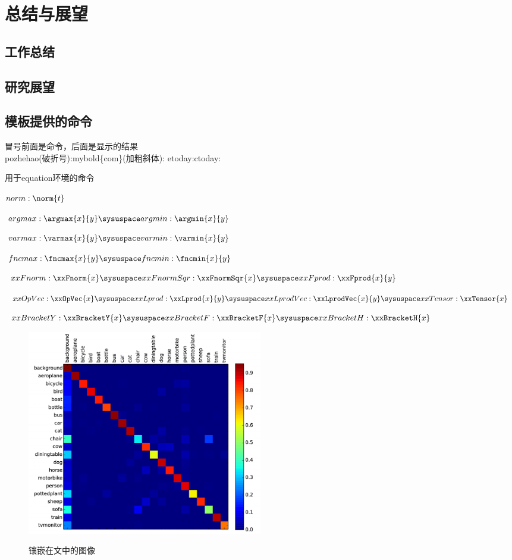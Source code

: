 
\chapter{总结与展望}
\section{工作总结}
\section{研究展望}
\section{模板提供的命令}
冒号前面是命令，后面是显示的结果\\

pozhehao(破折号):\pozhehao \sysuspace mybold\{com\}(加粗斜体): \sysuspace  etoday:\etoday\sysuspace ctoday:\ctoday\sysuspace


用于equation环境的命令

$norm :\norm{t}$

$argmax:\argmax{x}{y}\sysuspace argmin:\argmin{x}{y}$

$varmax:\varmax{x}{y}\sysuspace  varmin:\varmin{x}{y}$

$fncmax:\fncmax{x}{y}\sysuspace  fncmin:\fncmin{x}{y}$

$xxFnorm:\xxFnorm{x}\sysuspace xxFnormSqr:\xxFnormSqr{x}\sysuspace xxFprod:\xxFprod{x}{y}$

$xxOpVec:\xxOpVec{x}\sysuspace xxLprod:\xxLprod{x}{y}\sysuspace xxLprodVec:\xxLprodVec{x}{y}\sysuspace xxTensor:\xxTensor{x}$

$xxBracketY:\xxBracketY{x}\sysuspace xxBracketF:\xxBracketF{x}\sysuspace xxBracketH:\xxBracketH{x}$

\begin{figure}
	\centering
	\includegraphics[width=0.5\textwidth]{image/result/confusion.pdf}
	\caption{镶嵌在文中的图像}
	\label{fig:test}
	\label{fig:confusion}
\end{figure}